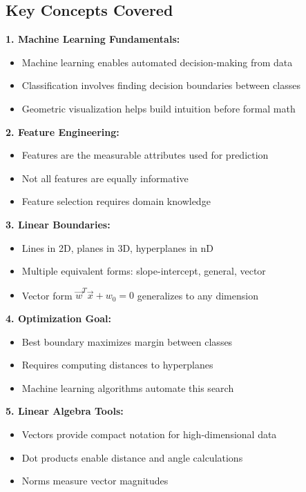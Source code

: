 \documentclass[12pt,a4paper]{article}
\theoremstyle{directpoint}
\theoremstyle{definition}
\begin{document}
\subsection{Key Concepts Covered}

\begin{tcolorbox}[enhanced,breakable,colback=yellow!10!white,colframe=orange!75!black,title=Module 1 Summary]

\textbf{1. Machine Learning Fundamentals:}
\begin{itemize}
    \item Machine learning enables automated decision-making from data
    \item Classification involves finding decision boundaries between classes
    \item Geometric visualization helps build intuition before formal math
\end{itemize}

\textbf{2. Feature Engineering:}
\begin{itemize}
    \item Features are the measurable attributes used for prediction
    \item Not all features are equally informative
    \item Feature selection requires domain knowledge
\end{itemize}

\textbf{3. Linear Boundaries:}
\begin{itemize}
    \item Lines in 2D, planes in 3D, hyperplanes in nD
    \item Multiple equivalent forms: slope-intercept, general, vector
    \item Vector form $\vec{w}^T\vec{x} + w_0 = 0$ generalizes to any dimension
\end{itemize}

\textbf{4. Optimization Goal:}
\begin{itemize}
    \item Best boundary maximizes margin between classes
    \item Requires computing distances to hyperplanes
    \item Machine learning algorithms automate this search
\end{itemize}

\textbf{5. Linear Algebra Tools:}
\begin{itemize}
    \item Vectors provide compact notation for high-dimensional data
    \item Dot products enable distance and angle calculations
    \item Norms measure vector magnitudes
\end{itemize}
\end{tcolorbox}
\end{document}
